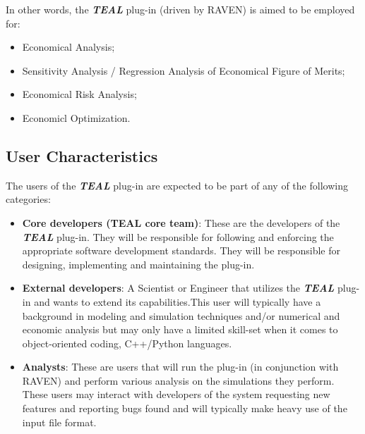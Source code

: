 In other words, the  \textbf{\textit{TEAL}} plug-in (driven by RAVEN) is aimed to be employed for:
\begin{itemize}
  \item Economical Analysis;
  \item Sensitivity Analysis / Regression Analysis of Economical Figure of Merits;
  \item Economical Risk Analysis;
  \item Economicl Optimization.
\end{itemize}


\subsection{User Characteristics}

The users of the \textbf{\textit{TEAL}} plug-in are expected to be part of any of the
following categories:
\begin{itemize}
  \item \textbf{Core developers (TEAL core team)}: These are the developers of the \textbf{\textit{TEAL}}  plug-in. They will be responsible for following
    and enforcing the appropriate software development standards. They will be responsible for designing, implementing and 
    maintaining the plug-in.
  \item \textbf{External developers}: A Scientist or Engineer that utilizes the \textbf{\textit{TEAL}}  plug-in and wants to extend its
  capabilities.This user will typically have a background in modeling and 
simulation techniques and/or numerical and economic analysis but may only have a limited skill-set when it comes to object-oriented 
coding, C++/Python languages.
  \item \textbf{Analysts}:  These are users that will run the plug-in (in conjunction with RAVEN) and perform various analysis on the 
  simulations they perform. These users may interact with developers of the system requesting new features and reporting bugs found 
  and will typically make heavy use of the input file format.
\end{itemize}
